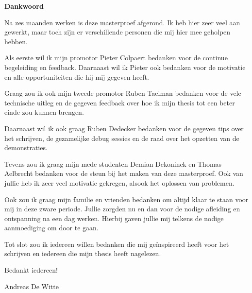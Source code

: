 \thispagestyle{empty}    %
\begin{center}
\textbf{Dankwoord}

Na zes maanden werken is deze masterproef afgerond. Ik heb hier zeer veel aan gewerkt, maar toch zijn er verschillende personen die mij hier mee geholpen hebben.

Als eerste wil ik mijn promotor Pieter Colpaert bedanken voor de continue begeleiding en feedback. Daarnaast wil ik Pieter ook bedanken voor de motivatie en alle opportuniteiten die hij mij gegeven heeft. 

Graag zou ik ook mijn tweede promotor Ruben Taelman bedanken voor de vele technische uitleg en de gegeven feedback over hoe ik mijn thesis tot een beter einde zou kunnen brengen.

Daarnaast wil ik ook graag Ruben Dedecker bedanken voor de gegeven tips over het schrijven, de gezamelijke debug sessies en de raad over het opzetten van de demonstraties.

Tevens zou ik graag mijn mede studenten Demian Dekoninck en Thomas Aelbrecht bedanken voor de steun bij het maken van deze masterproef. Ook van jullie heb ik zeer veel motivatie gekregen, alsook het oplossen van problemen.

Ook zou ik graag mijn familie en vrienden bedanken om altijd klaar te staan voor mij in deze zware periode. Jullie zorgden nu en dan voor de nodige afleiding en ontspanning na een dag werken. Hierbij gaven jullie mij telkens de nodige aanmoediging om door te gaan.

Tot slot zou ik iedereen willen bedanken die mij geïnspireerd heeft voor het schrijven en iedereen die mijn thesis heeft nagelezen. 

Bedankt iedereen!

Andreas De Witte

\end{center}